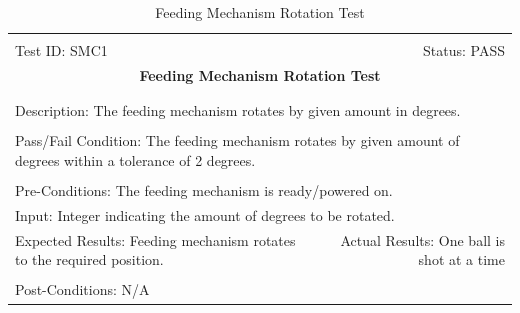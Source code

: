 \documentclass[11pt]{article}
\begin{document}
\begin{center}
\begin{table}[H]
\begin{tabular}{|l r|}\hline&\\[-2mm]
	Test ID: SMC1	&Status: PASS\\[-3mm]
	\multicolumn{2}{|c|}{\textbf{\large{Feeding Mechanism Rotation Test}}}\\&\\\hline&\\[-3mm]
	\multicolumn{2}{|p{\textwidth}|}{Description: The feeding mechanism rotates by given amount in degrees.}\\[1mm]\hline&\\[-3mm]
	\multicolumn{2}{|p{\textwidth}|}{Pass/Fail Condition: The feeding mechanism rotates by given amount of degrees within a tolerance of 2 degrees.}\\[1mm]\hline&\\[-3mm]
	\multicolumn{2}{|p{\textwidth}|}{Pre-Conditions: The feeding mechanism is ready/powered on.}\\[4mm]
	\multicolumn{2}{|p{\textwidth}|}{Input: Integer indicating the amount of degrees to be rotated.}\\[2mm]\hline
	\multicolumn{1}{|p{0.49\textwidth}}{Expected Results: Feeding mechanism rotates to the required position.}	&\multicolumn{1}{|p{0.45\textwidth}|}{Actual Results: One ball is shot at a time}\\\hline&\\[-3mm]
	\multicolumn{2}{|p{\textwidth}|}{Post-Conditions: N/A}\\\hline
\end{tabular}
\caption{Feeding Mechanism Rotation Test}
\end{table}
\end{center}
\end{document}
